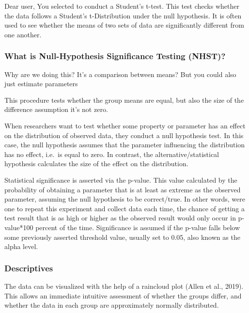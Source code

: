 \documentclass[
]{article}
\begin{document}
Dear user, You selected to conduct a Student's t-test. This test checks
whether the data follows a Student's t-Distribution under the null
hypothesis. It is often used to see whether the means of two sets of
data are significantly different from one another.

\hypertarget{what-is-null-hypothesis-significance-testing-nhst}{%
\subsubsection{What is Null-Hypothesis Significance Testing
(NHST)?}\label{what-is-null-hypothesis-significance-testing-nhst}}

Why are we doing this? It's a comparison between means? But you could
also just estimate parameters

This procedure tests whether the group means are equal, but also the
size of the difference assumption it's not zero.

When researchers want to test whether some property or parameter has an
effect on the distribution of observed data, they conduct a null
hypothesis test. In this case, the null hypothesis assumes that the
parameter influencing the distribution has no effect, i.e.~is equal to
zero. In contrast, the alternative/statistical hypothesis calculates the
size of the effect on the distribution.

Statistical significance is asserted via the p-value. This value
calculated by the probability of obtaining a parameter that is at least
as extreme as the observed parameter, assuming the null hypothesis to be
correct/true. In other words, were one to repeat this experiment and
collect data each time, the chance of getting a test result that is as
high or higher as the observed result would only occur in p-value*100
percent of the time. Significance is assumed if the p-value falls below
some previously asserted threshold value, usually set to 0.05, also
known as the alpha level.

\hypertarget{descriptives}{%
\subsubsection{Descriptives}\label{descriptives}}

The data can be visualized with the help of a raincloud plot (Allen et
al., 2019). This allows an immediate intuitive assessment of whether the
groups differ, and whether the data in each group are approximately
normally distributed.
\end{document}
